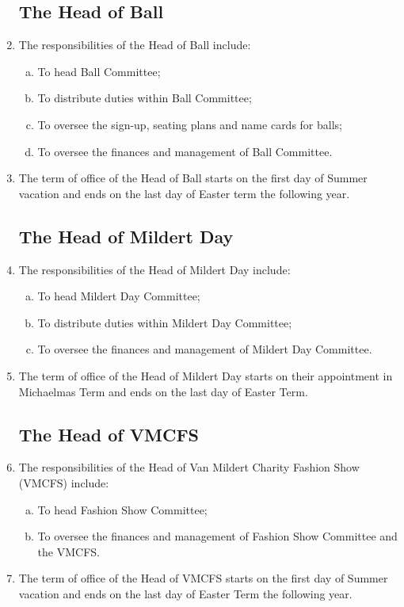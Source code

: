 \documentclass[12pt]{article}
\begin{document}
\begin{enumerate}
    \subsection{The Head of Ball}
    \item The responsibilities of the Head of Ball include:
    \begin{enumerate}[(a)]
        \item To head Ball Committee;
        \item To distribute duties within Ball Committee;
        \item To oversee the sign-up, seating plans and name cards for balls;
        \item To oversee the finances and management of Ball Committee.
    \end{enumerate}
    \item The term of office of the Head of Ball starts on the first day of Summer vacation and ends on the last day of Easter term the following year.
    \subsection{The Head of Mildert Day}
    \item The responsibilities of the Head of Mildert Day include:
    \begin{enumerate}[(a)]
        \item To head Mildert Day Committee;
        \item To distribute duties within Mildert Day Committee;
        \item To oversee the finances and management of Mildert Day Committee.
    \end{enumerate}
    \item The term of office of the Head of Mildert Day starts on their appointment in Michaelmas Term and ends on the last day of Easter Term.
    \subsection{The Head of VMCFS}
    \item The responsibilities of the Head of Van Mildert Charity Fashion Show (VMCFS) include:
    \begin{enumerate}[(a)]
        \item To head Fashion Show Committee;
        \item To oversee the finances and management of Fashion Show Committee and the VMCFS.
    \end{enumerate}
    \item The term of office of the Head of VMCFS starts on the first day of Summer vacation and ends on the last day of Easter Term the following year.


\end{enumerate}
\end{document}
